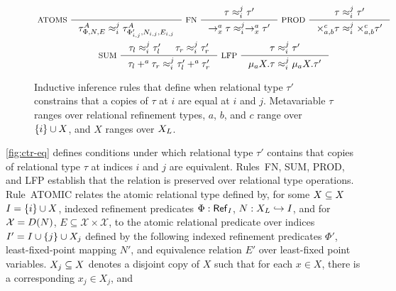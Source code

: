 \begin{figure}
  \centering
  \begin{gather*}
    \inference[ ATOMS ]{ }{ %
      \tau^A_{\Phi, N, E} \copyrel{i}{j} %
      \tau^A_{\Phi'_{i, j}, N_{i, j}, E_{i, j}} } 
    \inference[ FN ]{ 
      \tau \copyrel{i}{j} \tau' }{
      \to_x^a \tau \copyrel{i}{j} \to_x^a \tau' } 
    \inference[ PROD ]{
      \tau \copyrel{i}{j} \tau' }{
      \times_{a, b}^c \tau \copyrel{i}{j} \times_{a, b}^c \tau' } \\
    \inference[ SUM ]{
      \tau_l \copyrel{i}{j} \tau_l' & %
      \tau_r \copyrel{i}{j} \tau_r' }{
      \tau_l +^a \tau_r \copyrel{i}{j} \tau_l' +^a \tau_r' }
    \inference[ LFP ]{
      \tau \copyrel{i}{j} \tau' }{
      \mu_a X. \tau \copyrel{i}{j} \mu_a X. \tau' }
  \end{gather*}
  \caption{Inductive inference rules that define when relational type $\tau'$ constrains that a copies of $\tau$ at $i$ are equal at $i$ and $j$.
    Metavariable $\tau$ ranges over relational refinement types, %
    $a$, $b$, and $c$ range over $\{ i \} \cup X$, and %
    $X$ ranges over $X_L$. }
  \label{fig:ctr-eq}
\end{figure}
%
\autoref{fig:ctr-eq} defines conditions under which relational type
$\tau'$ contains that copies of relational type $\tau$ at indices $i$
and $j$ are equivalent.
%
Rules~FN, SUM, PROD, and LFP establish that the relation is preserved
over relational type operations.
%
Rule~ATOMIC relates the atomic relational type defined by, for some
$X \subseteq X$ $I = \{ i \} \cup X$, indexed refinement predicates
$\Phi : \mathsf{Ref}_{ I }$, %
$N : X_L \hookrightarrow I$, and for $\mathcal{X} = D(N)$,
$E \subseteq \mathcal{X} \times \mathcal{X}$, to the atomic relational
predicate over indices $I' = I \cup \{  j  \} \cup  X_j $ defined by
the following indexed refinement predicates $\Phi'$, least-fixed-point
mapping $N'$, and equivalence relation $E'$ over least-fixed point
variables.
%
$X_j \subseteq X$ denotes a disjoint copy of $X$ such that for
each $x \in X$, there is a corresponding $x_j \in X_j$, and

